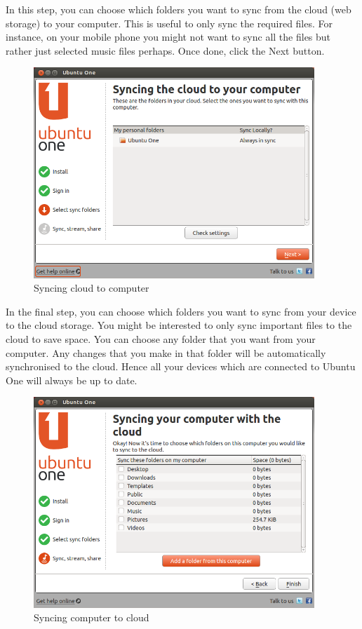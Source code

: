 \newpage
\par \noindent In this step, you can choose which folders you want to sync from the cloud (web storage) to your computer. This is useful to only sync the required files. For instance, on your mobile phone you might not want to sync all the files but rather just selected music files perhaps. Once done, click the Next button.\\

\begin{figure}[h!]	
	\centering
	\includegraphics[width=300pt]{./images/basic-tasks/share8.png}
	\caption{Syncing cloud to computer}	
	\label{fig:share8}		
\end{figure}

\par \noindent In the final step, you can choose which folders you want to sync from your device to the cloud storage. You might be interested to only sync important files to the cloud to save space. You can choose any folder that you want from your computer. Any changes that you make in that folder will be automatically synchronised to the cloud. Hence all your devices which are connected to Ubuntu One will always be up to date. \\

\begin{figure}[h!]	
	\centering
	\includegraphics[width=300pt]{./images/basic-tasks/share9.png}
	\caption{Syncing computer to cloud}	
	\label{fig:share9}		
\end{figure}

